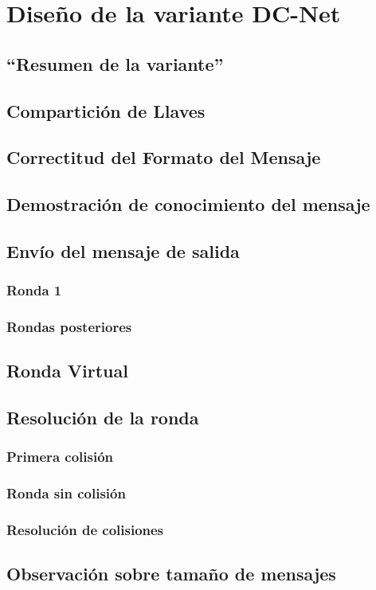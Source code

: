 \chapter{Diseño de la variante DC-Net}
\section{``Resumen de la variante''}
\section{Compartición de Llaves}
\section{Correctitud del Formato del Mensaje}
\section{Demostración de conocimiento del mensaje}
\section{Envío del mensaje de salida}
\subsection{Ronda 1}
\subsection{Rondas posteriores}
\section{Ronda Virtual}
\section{Resolución de la ronda}
\subsection{Primera colisión}
\subsection{Ronda sin colisión}
\subsection{Resolución de colisiones}
\section{Observación sobre tamaño de mensajes}